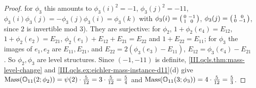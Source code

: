 \begin{proof}
for $\phi_3$ this amounts to $\phi_3(i)^2=-1$, $\phi_3(j)^2=-11$, $\phi_3(i)\phi_3(j)=-\phi_3(j)\phi_3(i)=\phi_3(k)$ with $\phi_3(i)=\begin{psmallmatrix}0&-1\\1&0\end{psmallmatrix}$,
$\phi_3(j)=\begin{psmallmatrix}1&0\\0&-1\end{psmallmatrix}$, since $2$ is invertible mod $3$). They are surjective: for $\phi_2$, $1+\phi_2(e_4)=E_{12}$,
$1+\phi_2(e_2)=E_{21}$, $\phi_2(e_1)+E_{12}+E_{21}=E_{22}$ and $1+E_{22}=E_{11}$; for $\phi_3$ the images of $e_1,e_2$ are $E_{11},E_{21}$, and
$E_{22}=2(\phi_3(e_3)-E_{11})$, $E_{12}=\phi_3(e_4)-E_{21}$. So $\phi_2,\phi_3$ are level structures. Since $(-1,-11)$ is definite,
\cref{III.qcls.thm:mass-level-change} and \cref{III.qcls.ex:eichler-mass-instance-d11}(d) give $\operatorname{Mass}(\mathbb{O}_{11}(2;\phi_2))=\psi(2)\cdot\frac5{12}=3\cdot\frac5{12}=\frac54$
and $\operatorname{Mass}(\mathbb{O}_{11}(3;\phi_3))=4\cdot\frac5{12}=\frac53$.
\end{proof}

